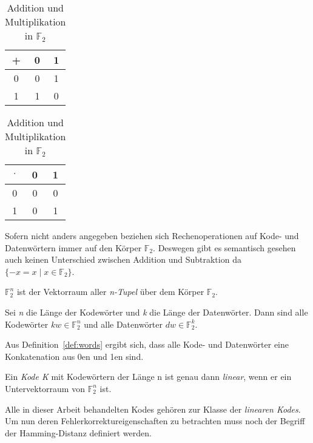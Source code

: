 \begin{table}[!h]
\begin{center}
\begin{tabular}{c|cc}
+ & 0 & 1 \\
\hline
0 & 0 & 1 \\
1 & 1 & 0 \\
\end{tabular}
\hspace{2cm}
\begin{tabular}{c|cc}
$\cdot$ & 0 & 1 \\
\hline
0 & 0 & 0 \\
1 & 0 & 1 \\
\end{tabular}
\caption{Addition und Multiplikation in $\mathbb{F}_2$}
\label{table:addmul}
\end{center}
\end{table}

Sofern nicht anders angegeben beziehen sich Rechenoperationen auf Kode- und Datenwörtern immer auf den Körper $\mathbb{F}_2$. Deswegen gibt es semantisch gesehen auch keinen Unterschied zwischen Addition und Subtraktion da $\{-x = x \mid x \in \mathbb{F}_2\}$.\cite[S. 2ff]{huffman2010fundamentals}

\begin{t_def}
$\mathbb{F}_{2}^{n}$ ist der Vektorraum aller {\em n-Tupel} über dem Körper $\mathbb{F}_2$.
\end{t_def}

\begin{t_def}
\label{def:words}
Sei {\em n} die Länge der Kodewörter und {\em k} die Länge der Datenwörter. Dann sind alle Kodewörter $kw \in \mathbb{F}_{2}^{n}$ und alle Datenwörter $dw \in \mathbb{F}_{2}^{k}$.
\end{t_def}

Aus Definition~\ref{def:words} ergibt sich, dass alle Kode- und Datenwörter eine Konkatenation aus 0en und 1en sind.

\begin{t_def}
Ein {\em Kode K} mit Kodewörtern der Länge n ist genau dann {\em linear}, wenn er ein Untervektorraum von $\mathbb{F}_{2}^{n}$ ist.
\end{t_def}

Alle in dieser Arbeit behandelten Kodes gehören zur Klasse der \textit{linearen Kodes}.\cite[S. 3ff]{huffman2010fundamentals} Um nun deren Fehlerkorrektureigenschaften zu betrachten muss noch der Begriff der Hamming-Distanz definiert werden.

